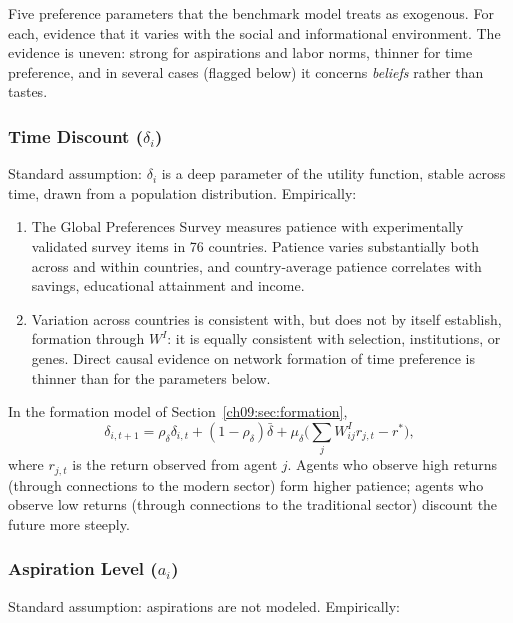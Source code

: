\documentclass[../structural_economics_book.tex]{subfiles}
\begin{document}
Five preference parameters that the benchmark model treats as exogenous. For each, evidence that it varies with the social and informational environment. The evidence is uneven: strong for aspirations and labor norms, thinner for time preference, and in several cases (flagged below) it concerns \textit{beliefs} rather than tastes.

\subsubsection{Time Discount ($\delta_i$)}

Standard assumption: $\delta_i$ is a deep parameter of the utility function, stable across time, drawn from a population distribution. Empirically:

\begin{stylizedfact}\label{ch09:prop:delta}
\leavevmode
\begin{enumerate}
\item The Global Preferences Survey \citep[\textit{QJE}]{falk2018global} measures patience with experimentally validated survey items in 76 countries. Patience varies substantially both across and within countries, and country-average patience correlates with savings, educational attainment and income.
\item Variation across countries is consistent with, but does not by itself establish, formation through $W^I$: it is equally consistent with selection, institutions, or genes. Direct causal evidence on network formation of time preference is thinner than for the parameters below.
\end{enumerate}
\end{stylizedfact}

In the formation model of Section~\ref{ch09:sec:formation},
\[
\delta_{i,t+1} = \rho_\delta \delta_{i,t} + (1-\rho_\delta)\bar{\delta} + \mu_\delta\Big(\sum_j W^I_{ij} r_{j,t} - r^*\Big),
\]
where $r_{j,t}$ is the return observed from agent $j$. Agents who observe high returns (through connections to the modern sector) form higher patience; agents who observe low returns (through connections to the traditional sector) discount the future more steeply.


\subsubsection{Aspiration Level ($a_i$)}

Standard assumption: aspirations are not modeled. Empirically:
\end{document}
